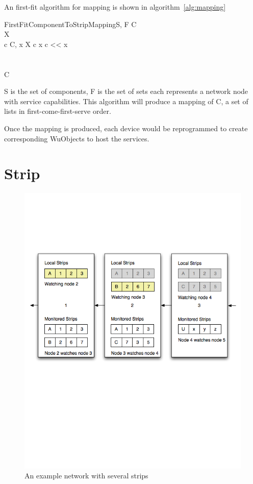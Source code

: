 An first-fit algorithm for mapping is shown in algorithm~\ref{alg:mapping}

\begin{pseudocode}[framebox]{FirstFitComponentToStripMapping}{S, F}
\label{alg:mapping}
C \\
X \\

\FOREACH c \in C, x \in X \DO
  \BEGIN
    \IF c \in x \THEN
      \BEGIN
        c << x\\
      \END\\
  \END\\

\RETURN C
\end{pseudocode}

S is the set of components, F is the set of
sets each represents a network node with service capabilities. This algorithm
will produce a mapping of C, a set of lists in first-come-first-serve order.

Once the mapping is produced, each device would be reprogrammed to create
corresponding WuObjects to host the services.

\section{Strip}
\label{s:ss}

\begin{figure}[h!]
\centering
    \includegraphics[width=\linewidth]{figures/strip1}
\caption{An example network with several strips}
\label{fig:strip1}
\end{figure}

